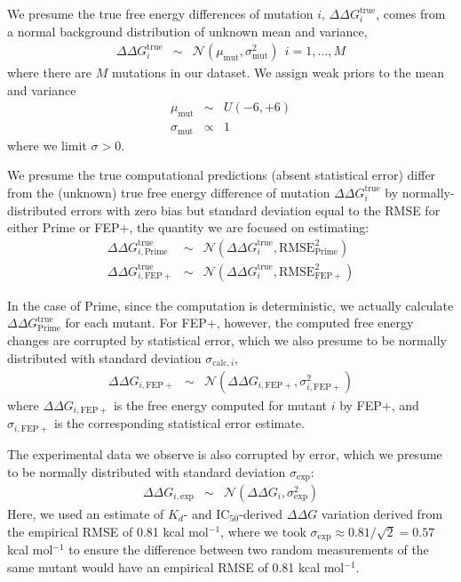 \documentclass[phd,tocprelim]{cornell}
\begin{document}
We presume the true free energy differences of mutation $i$, $\Delta\Delta G^\mathrm{true}_i$, comes from a normal background distribution of unknown mean and variance,
\begin{eqnarray}
\Delta \Delta G^\mathrm{true}_i &\sim& \mathcal{N}(\mu_\mathrm{mut}, \sigma_\mathrm{mut}^2) \:\: i = 1, \ldots, M
\end{eqnarray}
where there are $M$ mutations in our dataset.
We assign weak priors to the mean and variance
\begin{eqnarray}
\mu_\mathrm{mut} &\sim& U(-6, +6) \\
\sigma_\mathrm{mut} &\propto& 1
\end{eqnarray}
where we limit $\sigma > 0$.

We presume the true computational predictions (absent statistical error) differ from the (unknown) true free energy difference of mutation $\Delta\Delta G^\mathrm{true}_i$ by normally-distributed errors with zero bias but standard deviation equal to the RMSE for either Prime or FEP+, the quantity we are focused on estimating:
\begin{eqnarray}
\Delta\Delta G_{i, \mathrm{Prime}}^\mathrm{true} &\sim& \mathcal{N}(\Delta\Delta G^\mathrm{true}_i, \mathrm{RMSE}^2_\mathrm{Prime}) \\
\Delta\Delta G_{i, \mathrm{FEP+}}^\mathrm{true} &\sim& \mathcal{N}(\Delta\Delta G^\mathrm{true}_i, \mathrm{RMSE}^2_\mathrm{FEP+})
\end{eqnarray}

In the case of Prime, since the computation is deterministic, we actually calculate $\Delta\Delta G_\mathrm{Prime}^\mathrm{true}$ for each mutant.
For FEP+, however, the computed free energy changes are corrupted by statistical error, which we also presume to be normally distributed with standard deviation $\sigma_{\mathrm{calc},i}$,
\begin{eqnarray}
\Delta\Delta G_{i, \mathrm{FEP+}} &\sim& \mathcal{N}(\Delta\Delta G_{i, \mathrm{FEP+}}, \sigma_{i,\mathrm{FEP+}}^2)
\end{eqnarray}
where $\Delta\Delta G_{i, \mathrm{FEP+}}$ is the free energy computed for mutant $i$ by FEP+, and $\sigma_{i,\mathrm{FEP+}}$ is the corresponding statistical error estimate.

The experimental data we observe is also corrupted by error, which we presume to be normally distributed with standard deviation $\sigma_\mathrm{exp}$:
\begin{eqnarray}
\Delta\Delta G_{i,\mathrm{exp}} &\sim& \mathcal{N}(\Delta\Delta G_i, \sigma_\mathrm{exp}^2)
\end{eqnarray}
Here, we used an estimate of $K_d$- and IC$_{50}$-derived $\Delta \Delta G$ variation derived from the empirical RMSE of 0.81 kcal mol$^{-1}$, where we took $\sigma_\mathrm{exp} \approx 0.81 / \sqrt{2} = 0.57$ kcal mol$^{-1}$ to ensure the difference between two random measurements of the same mutant would have an empirical RMSE of 0.81 kcal mol$^{-1}$.
\end{document}
